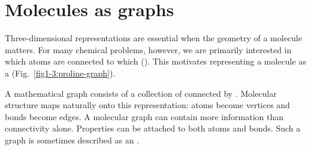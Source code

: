 \section{Molecules as graphs} 

Three-dimensional representations are essential when the geometry of a molecule matters.
For many chemical problems, however, we are primarily interested in which atoms are connected to which ().
This motivates representing a molecule as a  (Fig.~\ref{fig1-3:proline-graph}).

A mathematical graph consists of a collection of  connected by .
Molecular structure maps naturally onto this representation: atoms become vertices and bonds become edges.
A molecular graph can contain more information than connectivity alone.
Properties can be attached to both atoms and bonds.
Such a graph is sometimes described as an .

